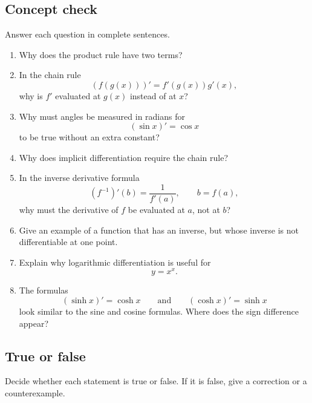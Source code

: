 \subsection{Concept check}
\label{subsec:chapter-5-concept-check}

Answer each question in complete sentences.

\begin{enumerate}
\item Why does the product rule have two terms?

\item In the chain rule
\[
(f(g(x)))'=f'(g(x))g'(x),
\]
why is \(f'\) evaluated at \(g(x)\) instead of at \(x\)?

\item Why must angles be measured in radians for
\[
(\sin x)'=\cos x
\]
to be true without an extra constant?

\item Why does implicit differentiation require the chain rule?

\item In the inverse derivative formula
\[
(f^{-1})'(b)=\frac1{f'(a)},
\qquad b=f(a),
\]
why must the derivative of \(f\) be evaluated at \(a\), not at \(b\)?

\item Give an example of a function that has an inverse, but whose inverse is not differentiable at one point.

\item Explain why logarithmic differentiation is useful for
\[
y=x^x.
\]

\item The formulas
\[
(\sinh x)'=\cosh x
\qquad\text{and}\qquad
(\cosh x)'=\sinh x
\]
look similar to the sine and cosine formulas.  Where does the sign difference appear?
\end{enumerate}

\subsection{True or false}
\label{subsec:chapter-5-true-false}

Decide whether each statement is true or false.  If it is false, give a correction or a counterexample.

